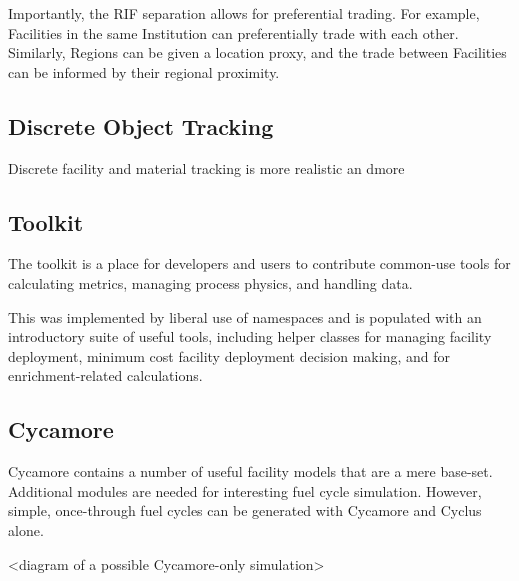 Importantly, the RIF separation allows for preferential trading. For example,
Facilities in the same Institution can preferentially trade with each
other. Similarly, Regions can be given a location proxy, and the trade between
Facilities can be informed by their regional proximity.

\subsection{Discrete Object Tracking}

Discrete facility and material tracking is more realistic an dmore 

\subsection{Toolkit}

The toolkit is a place for developers and users to contribute common-use tools 
for calculating metrics, managing process physics, and handling data.

This was implemented by liberal use of namespaces and is populated with an
introductory suite of useful tools, including helper classes for managing
facility deployment, minimum cost facility deployment decision making, and for
enrichment-related calculations.

\subsection{Cycamore}

Cycamore contains a number of useful facility models that are a mere base-set.
Additional modules are needed for interesting fuel cycle simulation. However,
simple, once-through fuel cycles can be generated with Cycamore and Cyclus alone.

<diagram of a possible Cycamore-only simulation>

